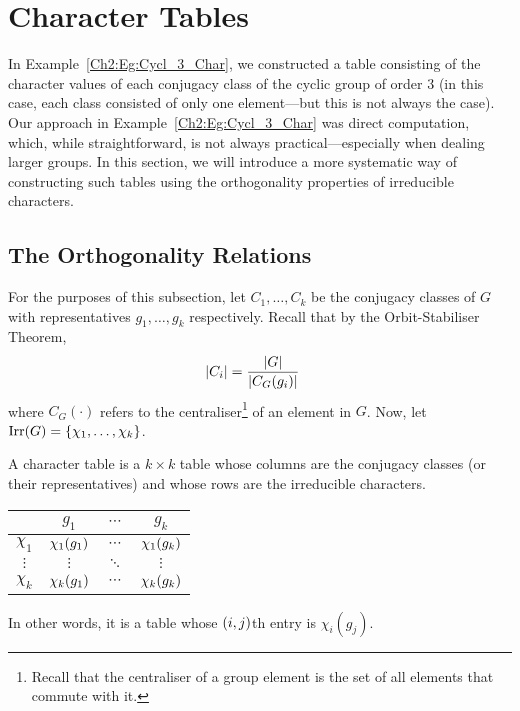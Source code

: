 \section{Character Tables}

In Example~\ref{Ch2:Eg:Cycl_3_Char}, we constructed a table consisting of the character values of each conjugacy class of the cyclic group of order $3$ (in this case, each class consisted of only one element---but this is not always the case). Our approach in Example~\ref{Ch2:Eg:Cycl_3_Char} was direct computation, which, while straightforward, is not always practical---especially when dealing larger groups. In this section, we will introduce a more systematic way of constructing such tables using the orthogonality properties of irreducible characters.

\subsection{The Orthogonality Relations}

For the purposes of this subsection, let $C_1, \ldots, C_k$ be the conjugacy classes of $G$ with representatives $g_1, \ldots, g_k$ respectively. Recall that by the Orbit-Stabiliser Theorem,
\begin{align*}
    \left\lvert C_i \right\rvert &= \frac{\left\lvert G \right\rvert}{\left\lvert C_G(g_i) \right\rvert}
\end{align*}
where $C_G(\cdot)$ refers to the centraliser\footnote{Recall that the centraliser of a group element is the set of all elements that commute with it.} of an element in $G$. Now, let $\operatorname{Irr}\!\left( G \right) = \left\{ \chi_1, \ldots, \chi_k \right\}$.

\begin{boxdefinition}
    A character table is a $k \times k$ table whose columns are the conjugacy classes (or their representatives) and whose rows are the irreducible characters.
    \begin{table}[H]
        \centering
        \begin{tabular}{c|ccc}
            & $g_1$ & $\cdots$ & $g_k$ \\
            \hline
            $\chi_1$ & $\chi_{1}\!\left( g_1 \right)$ & $\cdots$ & $\chi_{1}\!\left( g_k \right)$ \\
            $\vdots$ & $\vdots$ & $\ddots$ & $\vdots$ \\
            $\chi_k$ & $\chi_{k}\!\left( g_1 \right)$ & $\cdots$ & $\chi_{k}\!\left( g_k \right)$
        \end{tabular}
    \end{table}
    In other words, it is a table whose $\left( i,j \right)$th entry is $\chi_i(g_j)$.
\end{boxdefinition}

